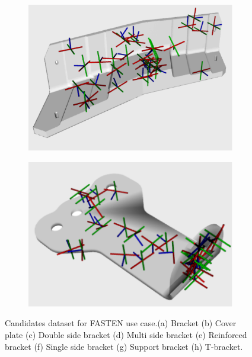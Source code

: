 \begin{figure}[h!]
{\begin{tcolorbox}
      \hfill
      \begin{subfigure}[c]{.23\textwidth}
         \centering
         \includegraphics[trim={0cm 0cm 0cm 0cm},clip,width=1\linewidth,angle=0]{Cap5/Figuras/candidates_plot/support_bracket_candidates.pdf}
         \caption{}
         \label{fig:support_bracket_candidates}
      \end{subfigure}
      \hfill
      \begin{subfigure}[c]{.23\textwidth}
         \centering
         \includegraphics[trim={0cm 0cm 0cm 0cm},clip,width=1\linewidth,angle=0]{Cap5/Figuras/candidates_plot/t_bracket_candidates.pdf}
         \caption{}
         \label{fig:t_bracket_candidates}
      \end{subfigure}
     \end{tcolorbox}
     \caption{Candidates dataset for FASTEN use case.(a) Bracket (b) Cover plate (c) Double side bracket (d) Multi side bracket (e) Reinforced bracket (f) Single side bracket (g) Support bracket (h) T-bracket.}
     \label{fig:obj_candiudates_fasten}
   }%
 \end{figure}
 
